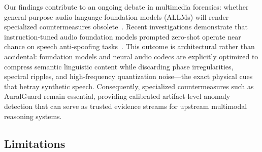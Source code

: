 Our findings contribute to an ongoing debate in multimedia forensics: whether general-purpose audio-language foundation models (ALLMs) will render specialized countermeasures obsolete~\cite{gong2025allm4add}. Recent investigations demonstrate that instruction-tuned audio foundation models prompted zero-shot operate near chance on speech anti-spoofing tasks~\cite{gong2025allm4add,oyucu2026generalization}. This outcome is architectural rather than accidental: foundation models and neural audio codecs are explicitly optimized to compress semantic linguistic content while discarding phase irregularities, spectral ripples, and high-frequency quantization noise—the exact physical cues that betray synthetic speech. Consequently, specialized countermeasures such as AuralGuard remain essential, providing calibrated artifact-level anomaly detection that can serve as trusted evidence streams for upstream multimodal reasoning systems.

\subsection{Limitations}
\label{ssec:limitations}

